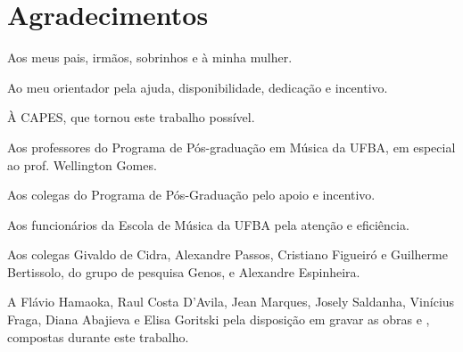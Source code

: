 \chapter*{Agradecimentos}
\label{cha:agradecimentos}

Aos meus pais, irmãos, sobrinhos e à minha mulher.

Ao meu orientador pela ajuda, disponibilidade, dedicação e incentivo.

À CAPES, que tornou este trabalho possível.

Aos professores do Programa de Pós-graduação em Música da UFBA, em
especial ao prof. Wellington Gomes.

Aos colegas do Programa de Pós-Graduação pelo apoio e incentivo.

Aos funcionários da Escola de Música da UFBA pela atenção e
eficiência.

Aos colegas Givaldo de Cidra, Alexandre Passos, Cristiano Figueiró e
Guilherme Bertissolo, do grupo de pesquisa Genos, e Alexandre
Espinheira.

A Flávio Hamaoka, Raul Costa D'Avila, Jean Marques, Josely Saldanha,
Vinícius Fraga, Diana Abajieva e Elisa Goritski pela disposição em
gravar as obras  e \obra{}, compostas
durante este trabalho.
